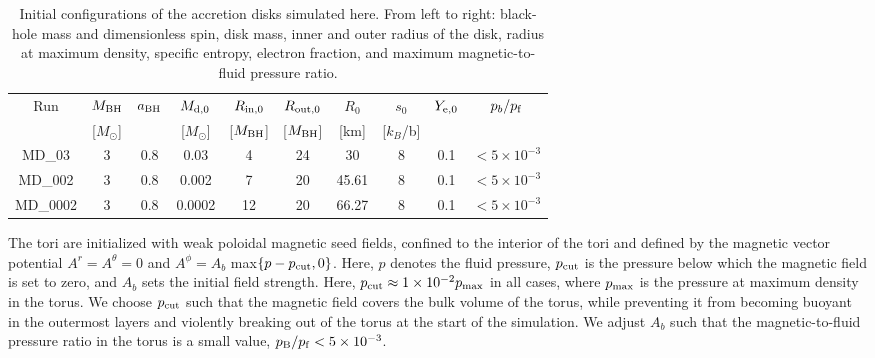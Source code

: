 \begin{table}
\caption{Initial configurations of the accretion disks simulated here. From left to right: black-hole mass and dimensionless spin, disk mass, inner and outer radius of the disk, radius at maximum density, specific entropy, electron fraction, and maximum magnetic-to-fluid pressure ratio.}
\begin{centering}
\begin{tabular}{cccccccccc}
\hline
Run  & $M_{\rm BH}$ & $a_{\rm BH}$ & $M_{\rm d,0}$ & $R_{\rm in,0}$ & $R_{\rm out,0}$  & $R_0$ & $s_0$ & $Y_{\rm e,0}$ & $p_b/p_{\rm f}$\\
& [$M_{\odot}$] & & [$M_{\odot}$] & [$M_{\rm BH}$] & [$M_{\rm BH}$] &  [km] & [$k_B$/b] & & \\
\hline 
MD\_03 & 3 & 0.8 & 0.03 & 4 & 24 & 30 & 8 & 0.1 & $< 5\times 10^{-3}$ \\
MD\_002 & 3 & 0.8 & 0.002 & 7 & 20 & 45.61 & 8 & 0.1 & $< 5\times 10^{-3}$ \\
MD\_0002 & 3 & 0.8 & 0.0002 & 12 & 20 & 66.27 & 8 & 0.1 & $< 5\times 10^{-3}$ \\
\hline 
\end{tabular}
\par\end{centering}
\label{tab:ini_config_torus}
\end{table}

The tori are initialized with weak poloidal magnetic seed fields, confined to the interior of the tori and defined by the magnetic vector potential $A^r = A^{\theta} = 0$ and $A^{\phi} = A_b$ max$\{p - p_{\rm cut}, 0\}$. Here, $p$ denotes the fluid pressure, $p_{\rm cut}$ is the pressure below which the magnetic field is set to zero, and $A_b$ sets the initial field strength. Here, $p_{\rm cut} \approx 1\times 10^{-2} p_{\rm max}$ in all cases, where $p_{\rm max}$ is the pressure at maximum density in the torus. We choose $p_{\rm cut}$ such that the magnetic field covers the bulk volume of the torus, while preventing it from becoming buoyant in the outermost layers and violently breaking out of the torus at the start of the simulation. We adjust $A_b$ such that the magnetic-to-fluid pressure ratio in the torus is a small value, $p_{\rm B}/p_{\rm f} < 5\times 10^{-3}$.

